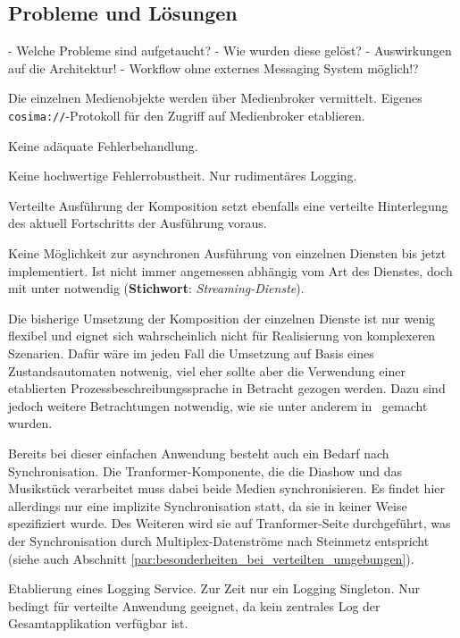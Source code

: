   
\subsection{Probleme und Lösungen} %
\label{sub:probleme_und_loesungen_architektur}

  - Welche Probleme sind aufgetaucht?
  - Wie wurden diese gelöst?
  - Auswirkungen auf die Architektur!
  - Workflow ohne externes Messaging System möglich!?
  
  Die einzelnen Medienobjekte werden über Medienbroker vermittelt. Eigenes \verb!cosima://!-Protokoll für den Zugriff auf Medienbroker etablieren.
    
  Keine adäquate Fehlerbehandlung.
  
  Keine hochwertige Fehlerrobustheit. Nur rudimentäres Logging.
  
  Verteilte Ausführung der Komposition setzt ebenfalls eine verteilte Hinterlegung des aktuell Fortschritts der Ausführung voraus.
  
  Keine Möglichkeit zur asynchronen Ausführung von einzelnen Diensten bis jetzt implementiert. Ist nicht immer angemessen abhängig vom Art des Dienstes, doch mit unter notwendig (\textbf{Stichwort}: \emph{Streaming-Dienste}).
  
  Die bisherige Umsetzung der Komposition der einzelnen Dienste ist nur wenig flexibel und eignet sich wahrscheinlich nicht für Realisierung von komplexeren Szenarien. Dafür wäre im jeden Fall die Umsetzung auf Basis eines Zustandsautomaten notwenig, viel eher sollte aber die Verwendung einer etablierten Prozessbeschreibungssprache in Betracht gezogen werden. Dazu sind jedoch weitere Betrachtungen notwendig, wie sie unter anderem in~\citep{samma08} gemacht wurden.

  Bereits bei dieser einfachen Anwendung besteht auch ein Bedarf nach Synchronisation. Die Tranformer-Komponente, die die Diashow und das Musikstück verarbeitet muss dabei beide Medien synchronisieren. Es findet hier allerdings nur eine implizite Synchronisation statt, da sie in keiner Weise spezifiziert wurde. Des Weiteren wird sie auf Tranformer-Seite durchgeführt, was der Synchronisation durch Multiplex-Datenströme nach Steinmetz entspricht~\citep[S. 609]{multimedia_technologie} (siehe auch Abschnitt \ref{par:besonderheiten_bei_verteilten_umgebungen}).
  
  Etablierung eines Logging Service. Zur Zeit nur ein Logging Singleton. Nur bedingt für verteilte Anwendung geeignet, da kein zentrales Log der Gesamtapplikation verfügbar ist.

